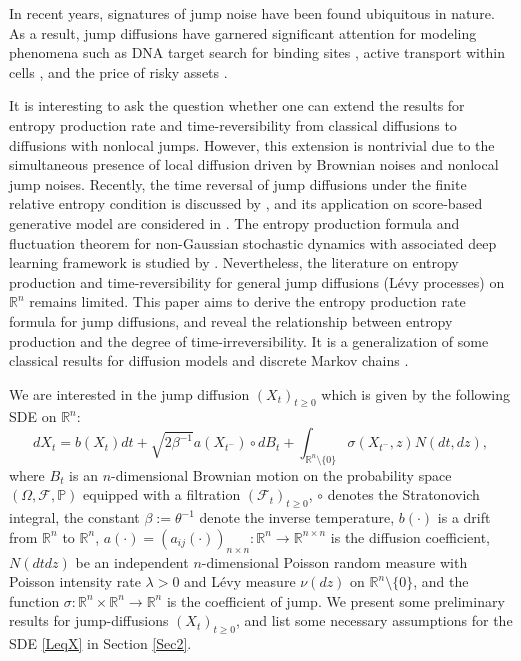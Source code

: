\documentclass[10pt]{article}
\theoremstyle{definition}
\theoremstyle{remark}
\numberwithin{equation}{section}
\begin{document}
In recent years, signatures of jump noise have been found ubiquitous in nature. As a result, jump diffusions have garnered significant attention for modeling phenomena such as DNA target search for binding sites \cite{SNG2011}, active transport within cells \cite{LVS2015}, and the price of risky assets \cite{DK08}.  

It is interesting to ask the question whether one can extend the results for entropy production rate and time-reversibility from classical diffusions to diffusions with nonlocal jumps. 
However, this extension is nontrivial due to the simultaneous presence of local diffusion driven by Brownian noises and nonlocal jump noises.
Recently, the time reversal of jump diffusions under the finite relative entropy condition is discussed by \cite{CL22}, and its application on score-based generative model are considered in \cite{YP23, GeneratorMatching}. The entropy production formula and fluctuation theorem for non-Gaussian stochastic dynamics with associated deep learning framework is studied by \cite{HLMZ25}.
Nevertheless, the literature on entropy production and time-reversibility for general jump diffusions (L\'{e}vy processes) on $\mathbb{R}^n$ remains limited. This paper aims to derive the entropy production rate formula for jump diffusions, and reveal the relationship between entropy production and the degree of time-irreversibility. It is a  generalization of some classical results for diffusion models and discrete Markov chains  \cite{QQT02, MN03}. 

We are interested in the jump diffusion $(X_t)_{t\geq 0}$ which is given by the following SDE on $\mathbb{R}^n$:
\begin{equation}\label{LeqX}
 dX_t =  b(X_{t})dt +  \sqrt{2\beta^{-1}} a(X_{t^-}) \circ dB_t  +  \int_{\mathbb{R}^n\setminus\{0\}} \sigma(X_{t^{-}},z) N(dt,dz),
\end{equation}
where $B_t$ is an $n$-dimensional Brownian motion on the probability space $(\Omega, \mathscr{F}, \mathbb{P})$ equipped with a filtration $(\mathscr{F}_t)_{t\geq 0}$, $\circ$ denotes the Stratonovich integral, the constant $\beta:=\theta^{-1}$ denote the inverse temperature, $b(\cdot)$ is a drift from $\mathbb{R}^n$ to $\mathbb{R}^n$, $a(\cdot)=(a_{ij}(\cdot))_{n\times n}:\mathbb{R}^n \rightarrow  \mathbb{R}^{n \times n}$ is the diffusion coefficient, $N(dtdz)$ be an independent $n$-dimensional Poisson random measure with Poisson intensity rate $\lambda>0$ and L\'{e}vy measure $\nu(dz)$ on $\mathbb{R}^n \setminus\{0\}$, and the function $\sigma:\mathbb{R}^n \times \mathbb{R}^n \rightarrow  \mathbb{R}^{n}$ is the coefficient of jump. We present some preliminary results for jump-diffusions $(X_t)_{t\geq 0}$, and list some necessary assumptions for the SDE \eqref{LeqX} in Section \ref{Sec2}.
\end{document}
